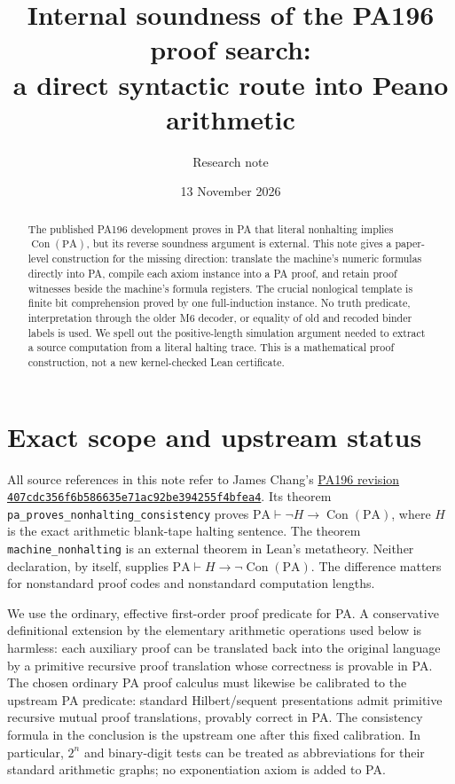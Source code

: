 \documentclass[11pt]{article}
\title{Internal soundness of the PA196 proof search:\\a direct syntactic route into Peano arithmetic}
\author{Research note}
\date{13 November 2026}
\newcommand{\PA}{\mathrm{PA}}
\newcommand{\Con}{\operatorname{Con}}
\begin{document}
\maketitle

\begin{abstract}
The published PA196 development proves in PA that literal nonhalting
implies $\Con(\PA)$, but its reverse soundness argument is external.
This note gives a paper-level construction for the missing direction:
translate the machine's numeric formulas directly into PA, compile each
axiom instance into a PA proof, and retain proof witnesses beside the
machine's formula registers.  The crucial nonlogical template is finite
bit comprehension proved by one full-induction instance.  No truth
predicate, interpretation through the older M6 decoder, or equality of
old and recoded binder labels is used.  We spell out the positive-length
simulation argument needed to extract a source computation from a literal
halting trace.  This is a mathematical proof construction, not a new
kernel-checked Lean certificate.
\end{abstract}

\section{Exact scope and upstream status}

All source references in this note refer to James Chang's
\href{https://github.com/jamesyc/BusyBeaver/tree/407cdc356f6b586635e71ac92be394255f4bfea4}{PA196 revision
\nolinkurl{407cdc356f6b586635e71ac92be394255f4bfea4}}.
Its theorem \texttt{pa\_proves\_nonhalting\_consistency} proves
$\PA\vdash\neg H\to\Con(\PA)$, where $H$ is the exact arithmetic
blank-tape halting sentence.  The theorem
\texttt{machine\_nonhalting} is an external theorem in Lean's metatheory.
Neither declaration, by itself, supplies $\PA\vdash H\to\neg\Con(\PA)$.
The difference matters for nonstandard proof codes and nonstandard
computation lengths.

We use the ordinary, effective first-order proof predicate for PA.  A
conservative definitional extension by the elementary arithmetic
operations used below is harmless: each auxiliary proof can be
translated back into the original language by a primitive recursive
proof translation whose correctness is provable in PA.  The chosen ordinary
PA proof calculus must likewise be calibrated to the upstream PA predicate:
standard Hilbert/sequent presentations admit primitive recursive mutual
proof translations, provably correct in PA.  The consistency formula in
the conclusion is the upstream one after this fixed calibration.  In particular,
$2^n$ and binary-digit tests can be treated as abbreviations for their
standard arithmetic graphs; no exponentiation axiom is added to PA.
\end{document}
